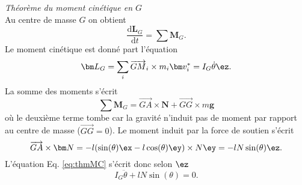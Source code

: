 \par\vspace{2mm}
{\textit{Théorème du moment cinétique en $G$}}\\
Au centre de masse $G$ on obtient
\begin{equation}
     \frac{\mathrm d \bm{L}_G}{\mathrm d t} = \sum \bm M_G.\label{eq:thmMC}
\end{equation}
Le moment cinétique est donné part l'équation
\begin{equation}
    \bm L_G = \sum_i \overrightarrow{GM}_i \times m_i \bm v_i^*= I_G \dot\theta \ez.
\end{equation}
La somme des moments s'écrit
\begin{equation}
    \sum \bm M_G = \overrightarrow{GA}\times \bm N + \overrightarrow{GG}\times m\bm g
\end{equation}
où le deuxième terme tombe car la gravité n'induit pas de moment par rapport au centre de masse ($\overrightarrow{GG}=0$).
Le moment induit par la force de soutien s'écrit
\begin{equation}
  \overrightarrow{GA}\times \bm N = -l(\sin(\theta)\ex - l\cos(\theta) \ey)\times N\ey= -lN\sin(\theta) \ez.
\end{equation}
L'équation Eq. \eqref{eq:thmMC} s'écrit donc selon $\ez$
\begin{equation}
    I_G \ddot\theta + lN\sin(\theta) = 0.\label{eq:thmMC_ez}
\end{equation}